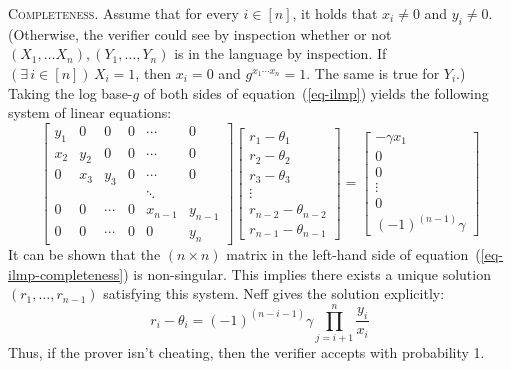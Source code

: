 \documentclass[letter]{article}
\newcommand{\heading}[1]{\noindent \textsc{#1}}
\begin{document}
\heading{Completeness.}
Assume that for every $i \in [n]$, it holds that $x_i \ne 0$ and $y_i \ne 0$.
(Otherwise, the verifier could see by inspection whether or not $(X_1, \ldots
X_n),(Y_1, \ldots, Y_n)$ is in the language by inspection. If $(\exists \, i \in
[n]) \, X_i = 1$, then $x_i = 0$ and $g^{x_1 \cdots x_n} = 1$. The same is true for
$Y_i$.)
Taking the log base-$g$ of both sides of equation~(\ref{eq-ilmp}) yields the
following system of linear equations:
\begin{equation}\label{eq-ilmp-completeness}
  \begin{bmatrix}
    y_1 & 0   & 0      & 0       & \cdots  & 0       \\
    x_2 & y_2 & 0      & 0       & \cdots  & 0       \\
    0   & x_3 & y_3    & 0       & \cdots  & 0       \\
        &     &        &         & \ddots  &         \\
    0   & 0   & \cdots & 0       & x_{n-1} & y_{n-1} \\
    0   & 0   & \cdots & 0       & 0       & y_{n}
  \end{bmatrix}
  \begin{bmatrix}
    r_1 - \theta_1 \\
    r_2 - \theta_2 \\
    r_3 - \theta_3 \\
    \vdots \\
    r_{n-2} - \theta_{n-2} \\
    r_{n-1} - \theta_{n-1}
  \end{bmatrix} =
  \begin{bmatrix}
    -\gamma x_1 \\
    0 \\
    0 \\
    \vdots \\
    0 \\
    (-1)^{(n-1)}\gamma
  \end{bmatrix}
\end{equation}
It can be shown that the $(n \times n)$ matrix in the left-hand side of
equation~(\ref{eq-ilmp-completeness}) is non-singular. This implies there exists
a unique solution $(r_1, \ldots, r_{n-1})$ satisfying this system. Neff gives
the solution explicitly:
\begin{equation} \label{eq-ilmp-findr}
  r_i - \theta_i = (-1)^{(n-i-1)} \gamma \prod_{j=i+1}^n \frac{y_i}{x_i}
\end{equation}
Thus, if the prover isn't cheating, then the verifier accepts with
probability 1.
\end{document}
